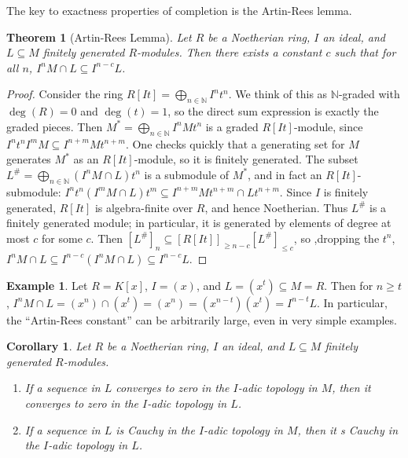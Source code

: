 \documentclass{amsart}[12pt]
\newcommand{\N}{\mathbb{N}}
\numberwithin{equation}{section}
\theoremstyle{plain} %
\newtheorem{thm}[equation]{Theorem}
\newtheorem{cor}[equation]{Corollary}
\theoremstyle{definition}
\newtheorem{ex}[equation]{Example}
\theoremstyle{remark}
\begin{document}
 The key to exactness properties of completion is the Artin-Rees lemma.
 
 \begin{thm}[Artin-Rees Lemma]
 Let $R$ be a Noetherian ring, $I$ an ideal, and $L\subseteq M$  finitely generated $R$-modules. Then there exists a constant $c$ such that for all $n$, $I^n M\cap L \subseteq I^{n-c} L$.
 \end{thm}
\begin{proof} Consider the ring $R[It] = \bigoplus_{n\in \N} I^n t^n$. We think of this as $\N$-graded with $\deg(R)=0$ and $\deg(t)=1$, so the direct sum expression is exactly the graded pieces. Then $M^*= \bigoplus_{n\in \N} I^n M t^n$ is a graded $R[It]$-module, since $I^n t^n I^m M \subseteq I^{n+m} M t^{n+m}$. One checks quickly that a generating set for $M$ generates $M^*$ as an $R[It]$-module, so it is finitely generated. The subset $L^{\#}= \bigoplus_{n\in \N} (I^n M \cap L) t^n$ is a submodule of $M^*$, and in fact an $R[It]$-submodule: $I^n t^n (I^m M \cap L) t^m \subseteq I^{n+m} M t^{n+m} \cap L t^{n+m}$. Since $I$ is finitely generated, $R[It]$ is algebra-finite over $R$, and hence Noetherian. Thus $L^{\#}$ is a finitely generated module; in particular, it is generated by elements of degree at most $c$ for some $c$. Then $[L^{\#}]_n \subseteq [R[It]]_{\geq n-c} [L^{\#}]_{\leq c}$, so ,dropping the $t^n$,  $I^n M \cap L \subseteq I^{n-c} (I^n M \cap L) \subseteq I^{n-c} L$.
\end{proof}

\begin{ex} Let $R=K[x]$, $I=(x)$, and $L=(x^t) \subseteq M=R$. Then for $n\geq t$,  $I^n M \cap L = (x^n) \cap (x^t) = (x^n) = (x^{n-t}) (x^t) = I^{n-t} L$. In particular, the ``Artin-Rees constant'' can be arbitrarily large, even in  very simple examples.
\end{ex}

\begin{cor} Let $R$ be a Noetherian ring, $I$ an ideal, and $L\subseteq M$  finitely generated $R$-modules.
\begin{enumerate}
\item  If a sequence in $L$ converges to zero in the $I$-adic topology in $M$, then it converges to zero in the $I$-adic topology in $L$.
\item  If a sequence in $L$ is Cauchy in the $I$-adic topology in $M$, then it s Cauchy in the $I$-adic topology in $L$.
\end{enumerate}
\end{cor}
\end{document}
